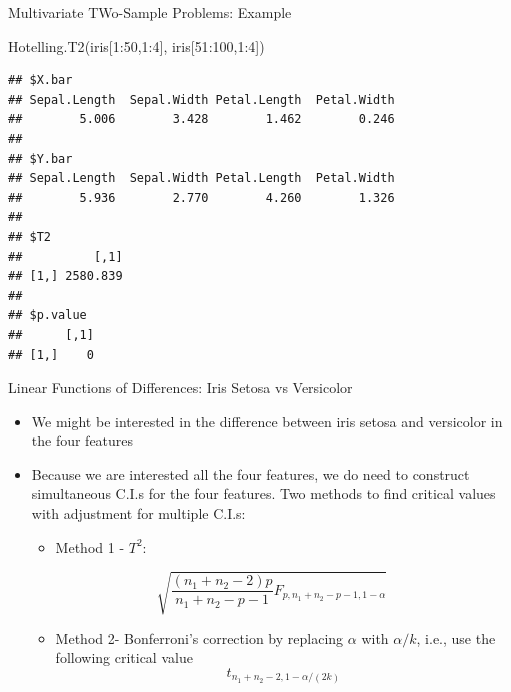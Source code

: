 \documentclass[
  ignorenonframetext,
]{beamer}
\newenvironment{Shaded}{\begin{snugshade}}{\end{snugshade}}
\newcommand{\DecValTok}[1]{\textcolor[rgb]{0.00,0.00,0.81}{#1}}
\newcommand{\FunctionTok}[1]{\textcolor[rgb]{0.00,0.00,0.00}{#1}}
\newcommand{\NormalTok}[1]{#1}
\newcommand{\SpecialCharTok}[1]{\textcolor[rgb]{0.00,0.00,0.00}{#1}}
\providecommand{\tightlist}{%
  \setlength{\itemsep}{0pt}\setlength{\parskip}{0pt}}
\begin{document}
\begin{frame}[fragile]{Multivariate TWo-Sample Problems: Example}
\protect\hypertarget{multivariate-two-sample-problems-example}{}
\tiny

\begin{Shaded}
\begin{Highlighting}[]
\FunctionTok{Hotelling.T2}\NormalTok{(iris[}\DecValTok{1}\SpecialCharTok{:}\DecValTok{50}\NormalTok{,}\DecValTok{1}\SpecialCharTok{:}\DecValTok{4}\NormalTok{], iris[}\DecValTok{51}\SpecialCharTok{:}\DecValTok{100}\NormalTok{,}\DecValTok{1}\SpecialCharTok{:}\DecValTok{4}\NormalTok{])}
\end{Highlighting}
\end{Shaded}

\begin{verbatim}
## $X.bar
## Sepal.Length  Sepal.Width Petal.Length  Petal.Width 
##        5.006        3.428        1.462        0.246 
## 
## $Y.bar
## Sepal.Length  Sepal.Width Petal.Length  Petal.Width 
##        5.936        2.770        4.260        1.326 
## 
## $T2
##          [,1]
## [1,] 2580.839
## 
## $p.value
##      [,1]
## [1,]    0
\end{verbatim}

\normalsize
\end{frame}

\begin{frame}{Linear Functions of Differences: Iris Setosa vs
Versicolor}
\protect\hypertarget{linear-functions-of-differences-iris-setosa-vs-versicolor}{}
\begin{itemize}
\item
  We might be interested in the difference between iris setosa and
  versicolor in the four features
\item
  Because we are interested all the four features, we do need to
  construct simultaneous C.I.s for the four features. Two methods to
  find critical values with adjustment for multiple C.I.s:

  \begin{itemize}
  \tightlist
  \item
    Method 1 - \(T^2\):
  \end{itemize}

  \[\sqrt{\frac{(n_1+n_2-2)p}{n_1+n_2-p-1}F_{p, n_1+n_2-p-1, 1-\alpha}}\]

  \begin{itemize}
  \tightlist
  \item
    Method 2- Bonferroni's correction by replacing \(\alpha\) with
    \(\alpha/k\), i.e., use the following critical value
    \[t_{n_1+n_2-2, 1-\alpha/(2k)}\]
  \end{itemize}
\end{itemize}
\end{frame}
\end{document}
